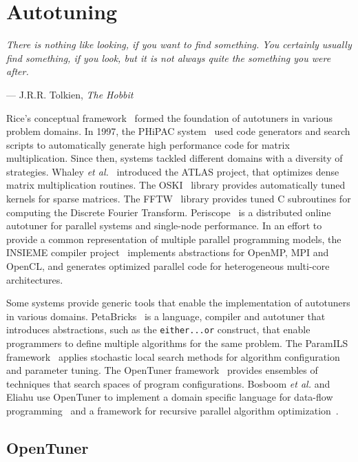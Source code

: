 \chapter{Autotuning}
\label{chap:autotuning}
\epigraph{\textit{There is nothing like looking, if you want to find something. You
certainly usually find something, if you look, but it is not always quite the
something you were after.}}{--- J.R.R. Tolkien, \textit{The Hobbit}}

Rice's conceptual framework~\cite{rice1976algorithm} formed the foundation
of autotuners in various problem domains.  In 1997, the PHiPAC
system~\cite{bilmes1997phipac} used code generators and search scripts to
automatically generate high performance code
for matrix multiplication. Since then, systems tackled different domains with a
diversity of strategies. Whaley \emph{et al.}~\cite{whaley1998atlas} introduced
the ATLAS project, that optimizes dense matrix multiplication routines. The
OSKI~\cite{vuduc2005oski} library provides automatically tuned kernels for
sparse matrices. The FFTW~\cite{frigo1998fftw} library provides tuned C
subroutines for computing the Discrete Fourier Transform.
Periscope~\cite{Gerndt:2010:Periscope} is a distributed online autotuner
for parallel systems and single-node performance.
In an effort to provide a common representation of multiple parallel programming models,
the INSIEME compiler project~\cite{jordan2012multi} implements abstractions for
OpenMP, MPI and OpenCL, and generates optimized parallel code for heterogeneous
multi-core architectures.

Some systems provide generic tools that enable the implementation of
autotuners in various domains. PetaBricks~\cite{ansel2009petabricks} is a
language, compiler and autotuner that introduces abstractions, such as the
\texttt{\footnotesize either...or} construct, that enable programmers to define
multiple algorithms for the same problem.  The ParamILS
framework~\cite{hutter2009paramils} applies stochastic local search methods
for algorithm configuration and parameter tuning. The OpenTuner
framework~\cite{ansel2014opentuner} provides ensembles of techniques that
search spaces of program configurations. Bosboom \emph{et al.} and Eliahu use
OpenTuner to implement a domain specific language for data-flow
programming~\cite{bosboom2014streamjit} and a framework for recursive parallel
algorithm optimization~\cite{eliahu2015frpa}.

\section{OpenTuner}
\label{sec:opentuner}

